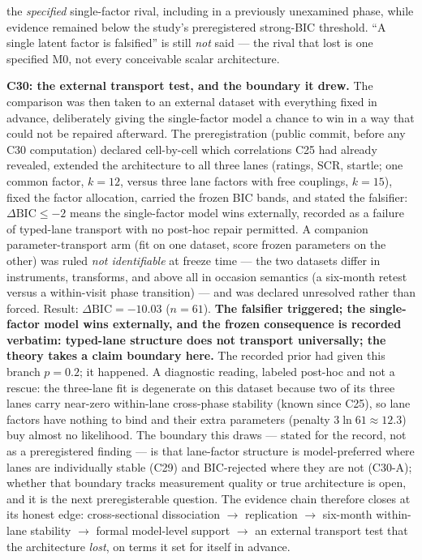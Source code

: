 \documentclass[9pt,twocolumn]{article}
\begin{document}
the \emph{specified} single-factor rival, including in a previously unexamined phase, while evidence remained below the study's preregistered strong-BIC threshold. ``A single latent factor is falsified'' is still \emph{not} said --- the rival that lost is one specified M0, not every conceivable scalar architecture.

\textbf{C30: the external transport test, and the boundary it drew.} The comparison was then taken to an external dataset with everything fixed in advance, deliberately giving the single-factor model a chance to win in a way that could not be repaired afterward. The preregistration (public commit, before any C30 computation) declared cell-by-cell which correlations C25 had already revealed, extended the architecture to all three lanes (ratings, SCR, startle; one common factor, $k{=}12$, versus three lane factors with free couplings, $k{=}15$), fixed the factor allocation, carried the frozen BIC bands, and stated the falsifier: $\Delta\mathrm{BIC}\le-2$ means the single-factor model wins externally, recorded as a failure of typed-lane transport with no post-hoc repair permitted. A companion parameter-transport arm (fit on one dataset, score frozen parameters on the other) was ruled \emph{not identifiable} at freeze time --- the two datasets differ in instruments, transforms, and above all in occasion semantics (a six-month retest versus a within-visit phase transition) --- and was declared unresolved rather than forced. Result: $\Delta\mathrm{BIC}=-10.03$ ($n{=}61$). \textbf{The falsifier triggered; the single-factor model wins externally, and the frozen consequence is recorded verbatim: typed-lane structure does not transport universally; the theory takes a claim boundary here.} The recorded prior had given this branch $p=0.2$; it happened. A diagnostic reading, labeled post-hoc and not a rescue: the three-lane fit is degenerate on this dataset because two of its three lanes carry near-zero within-lane cross-phase stability (known since C25), so lane factors have nothing to bind and their extra parameters (penalty $3\ln 61\approx12.3$) buy almost no likelihood. The boundary this draws --- stated for the record, not as a preregistered finding --- is that lane-factor structure is model-preferred where lanes are individually stable (C29) and BIC-rejected where they are not (C30-A); whether that boundary tracks measurement quality or true architecture is open, and it is the next preregisterable question. The evidence chain therefore closes at its honest edge: cross-sectional dissociation $\rightarrow$ replication $\rightarrow$ six-month within-lane stability $\rightarrow$ formal model-level support $\rightarrow$ an external transport test that the architecture \emph{lost}, on terms it set for itself in advance.
\end{document}
